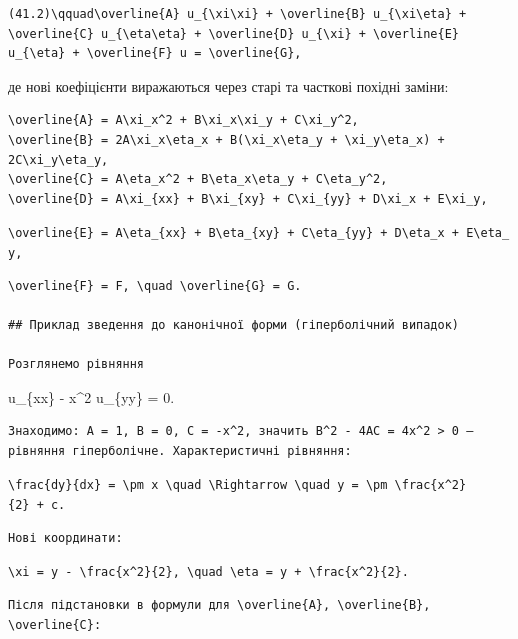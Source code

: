 \documentclass[
  ukrainian,
]{article}
\begin{document}
\begin{verbatim}
(41.2)\qquad\overline{A} u_{\xi\xi} + \overline{B} u_{\xi\eta} + \overline{C} u_{\eta\eta} + \overline{D} u_{\xi} + \overline{E} u_{\eta} + \overline{F} u = \overline{G},
\end{verbatim}

де нові коефіцієнти виражаються через старі та часткові похідні заміни:

\begin{verbatim}
\overline{A} = A\xi_x^2 + B\xi_x\xi_y + C\xi_y^2,
\overline{B} = 2A\xi_x\eta_x + B(\xi_x\eta_y + \xi_y\eta_x) + 2C\xi_y\eta_y,
\overline{C} = A\eta_x^2 + B\eta_x\eta_y + C\eta_y^2,
\overline{D} = A\xi_{xx} + B\xi_{xy} + C\xi_{yy} + D\xi_x + E\xi_y,
\end{verbatim}

\texttt{\textbackslash{}overline\{E\}\ =\ A\textbackslash{}eta\_\{xx\}\ +\ B\textbackslash{}eta\_\{xy\}\ +\ C\textbackslash{}eta\_\{yy\}\ +\ D\textbackslash{}eta\_x\ +\ E\textbackslash{}eta\_y,}

\begin{verbatim}
\overline{F} = F, \quad \overline{G} = G.

## Приклад зведення до канонічної форми (гіперболічний випадок)

Розглянемо рівняння
\end{verbatim}

u\_\{xx\} - x\^{}2 u\_\{yy\} = 0.

\begin{verbatim}
Знаходимо: A = 1, B = 0, C = -x^2, значить B^2 - 4AC = 4x^2 > 0 — рівняння гіперболічне. Характеристичні рівняння:
\end{verbatim}

\texttt{\textbackslash{}frac\{dy\}\{dx\}\ =\ \textbackslash{}pm\ x\ \textbackslash{}quad\ \textbackslash{}Rightarrow\ \textbackslash{}quad\ y\ =\ \textbackslash{}pm\ \textbackslash{}frac\{x\^{}2\}\{2\}\ +\ c.}

\begin{verbatim}
Нові координати:
\end{verbatim}

\texttt{\textbackslash{}xi\ =\ y\ -\ \textbackslash{}frac\{x\^{}2\}\{2\},\ \textbackslash{}quad\ \textbackslash{}eta\ =\ y\ +\ \textbackslash{}frac\{x\^{}2\}\{2\}.}

\begin{verbatim}
Після підстановки в формули для \overline{A}, \overline{B}, \overline{C}:
\end{verbatim}
\end{document}
